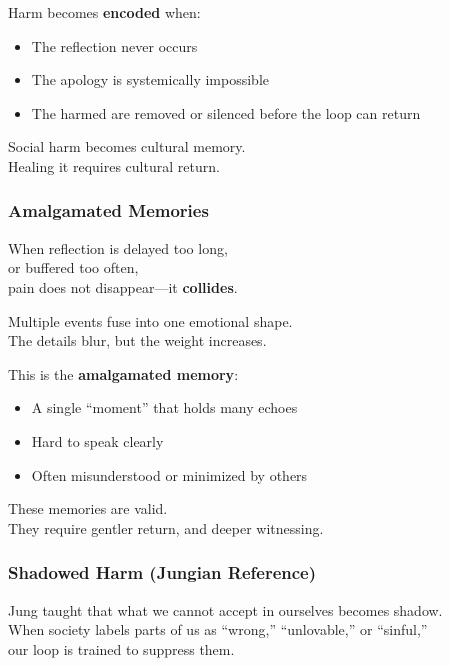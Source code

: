 Harm becomes \textbf{encoded} when:

\begin{itemize}
\item
  The reflection never occurs
\item
  The apology is systemically impossible
\item
  The harmed are removed or silenced before the loop can return
\end{itemize}

Social harm becomes cultural memory.\\
Healing it requires cultural return.

\subsubsection{\texorpdfstring{\textbf{Amalgamated
Memories}}{Amalgamated Memories}}\label{amalgamated-memories}

When reflection is delayed too long,\\
or buffered too often,\\
pain does not disappear---it \textbf{collides}.

Multiple events fuse into one emotional shape.\\
The details blur, but the weight increases.

This is the \textbf{amalgamated memory}:

\begin{itemize}
\item
  A single ``moment'' that holds many echoes
\item
  Hard to speak clearly
\item
  Often misunderstood or minimized by others
\end{itemize}

These memories are valid.\\
They require gentler return, and deeper witnessing.

\subsubsection{\texorpdfstring{\textbf{Shadowed Harm (Jungian
Reference)}}{Shadowed Harm (Jungian Reference)}}\label{shadowed-harm-jungian-reference}

Jung taught that what we cannot accept in ourselves becomes shadow.\\
When society labels parts of us as ``wrong,'' ``unlovable,'' or
``sinful,''\\
our loop is trained to suppress them.

